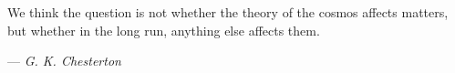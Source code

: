 \begin{titlepage}
\clearpage

\vspace*{7em}
\begin{center}
\begin{minipage}{6in}
\begin{center}
We think the question is not whether the theory of the cosmos affects matters, \\ but whether in the long run, anything else affects them.
\end{center}
\hfill --- \textit{G. K. Chesterton}
\end{minipage}
\end{center}

\clearpage

\endgroup
\end{titlepage}
